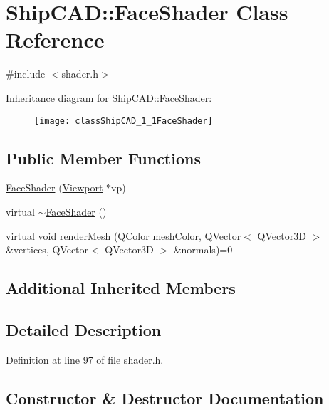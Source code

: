 \hypertarget{classShipCAD_1_1FaceShader}{}\section{Ship\+C\+AD\+:\+:Face\+Shader Class Reference}
\label{classShipCAD_1_1FaceShader}


{\ttfamily \#include $<$shader.\+h$>$}

Inheritance diagram for Ship\+C\+AD\+:\+:Face\+Shader\+:\begin{figure}[H]
\begin{center}
\leavevmode
\texttt{[image: classShipCAD\_1\_1FaceShader]}
\end{center}
\end{figure}
\subsection*{Public Member Functions}
\begin{DoxyCompactItemize}
\item 
\hyperlink{classShipCAD_1_1FaceShader_a67bd0296f829456035a829b95f1befb7}{Face\+Shader} (\hyperlink{classShipCAD_1_1Viewport}{Viewport} $\ast$vp)
\item 
virtual \hyperlink{classShipCAD_1_1FaceShader_afbd21e69afb094aea484144be9ac1fbd}{$\sim$\+Face\+Shader} ()
\item 
virtual void \hyperlink{classShipCAD_1_1FaceShader_adb71f051d1481058fe905f985a7166c1}{render\+Mesh} (Q\+Color mesh\+Color, Q\+Vector$<$ Q\+Vector3D $>$ \&vertices, Q\+Vector$<$ Q\+Vector3D $>$ \&normals)=0
\end{DoxyCompactItemize}
\subsection*{Additional Inherited Members}


\subsection{Detailed Description}


Definition at line 97 of file shader.\+h.



\subsection{Constructor \& Destructor Documentation}
